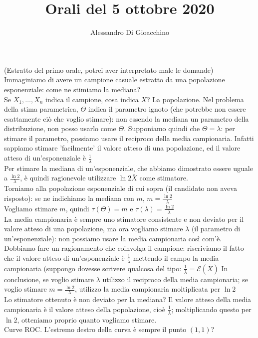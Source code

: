\documentclass{article}
\title{Orali del 5 ottobre 2020}
\author{Alessandro Di Gioacchino}
\begin{document}
    \maketitle
    
    (Estratto del primo orale, potrei aver interpretato male le domande) \\
    Immaginiamo di avere un campione casuale estratto da una popolazione esponenziale: come ne stimiamo la mediana? \\
    Se $ X_1, \dots, X_n $ indica il campione, cosa indica $ X $? La popolazione. Nel problema della stima parametrica, $ \Theta $ indica il parametro ignoto (che potrebbe non
    essere esattamente ciò che voglio stimare): non essendo la mediana un parametro della distribuzione, non posso usarlo come $ \Theta $. Supponiamo quindi che
    $ \Theta = \lambda $: per stimare il parametro, possiamo usare il reciproco della media campionaria. Infatti sappiamo stimare 'facilmente' il valore atteso di una
    popolazione, ed il valore atteso di un'esponenziale è $ \frac{ 1 }{ \lambda } $ \\
    Per stimare la mediana di un'esponenziale, che abbiamo dimostrato essere uguale a $ \frac{ \ln 2 }{ \lambda } $, è quindi ragionevole utilizzare $ \ln 2 \bar X $ come stimatore. \\
    
    Torniamo alla popolazione esponenziale di cui sopra (il candidato non aveva risposto): se ne indichiamo la mediana con $ m $, $ m = \frac{ \ln 2 }{ \lambda } $ \\
    Vogliamo stimare $ m $, quindi $ \tau ( \Theta ) = m $ e $ \tau ( \lambda ) = \frac{ \ln 2 }{ \lambda } $ \\
    La media campionaria è sempre uno stimatore consistente e non deviato per il valore atteso di una popolazione, ma ora vogliamo stimare $ \lambda $ (il parametro di
    un'esponenziale): non possiamo usare la media campionaria così com'è. \\
    Dobbiamo fare un ragionamento che coinvolga il campione: riscriviamo il fatto che il valore atteso di un'esponenziale è $ \frac{ 1 }{ \lambda } $ mettendo il campo la media
    campionaria (suppongo dovesse scrivere qualcosa del tipo: $ \frac{ 1 }{ \lambda } = \mathcal E ( \bar X ) $ In conclusione, se voglio stimare $ \lambda $ utilizzo il reciproco
    della media campionaria; se voglio stimare $ m = \frac{ \ln 2 }{ \lambda } $, utilizzo la media campionaria moltiplicata per $ \ln 2 $ \\
    Lo stimatore ottenuto è non deviato per la mediana? Il valore atteso della media campionaria è il valore atteso della popolazione, cioè $ \frac{ 1 }{ \lambda } $; moltiplicando
    questo per $ \ln 2 $, otteniamo proprio quanto vogliamo stimare. \\
    Curve ROC. L'estremo destro della curva è sempre il punto $ ( 1, 1 ) $? \\
    
\end{document}
